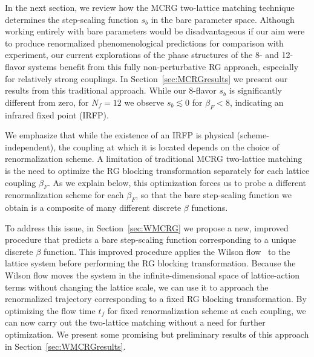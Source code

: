 \documentclass{PoS}
\newcommand{\be}{\ensuremath{\beta} }
\newcommand{\lsim}{\ensuremath{\lesssim} }
\newcommand{\secref}[1]{Section~\ref{#1}}
\begin{document}
In the next section, we review how the MCRG two-lattice matching technique determines the step-scaling function $s_b$ in the bare parameter space.
Although working entirely with bare parameters would be disadvantageous if our aim were to produce renormalized phenomenological predictions for comparison with experiment, our current explorations of the phase structures of the 8- and 12-flavor systems benefit from this fully non-perturbative RG approach, especially for relatively strong couplings.
In \secref{sec:MCRGresults} we present our results from this traditional approach.
While our 8-flavor $s_b$ is significantly different from zero, for $N_f = 12$ we observe $s_b \lsim 0$ for $\be_F < 8$, indicating an infrared fixed point (IRFP).

We emphasize that while the existence of an IRFP is physical (scheme-independent), the coupling at which it is located depends on the choice of renormalization scheme.
A limitation of traditional MCRG two-lattice matching is the need to optimize the RG blocking transformation separately for each lattice coupling $\be_F$.
As we explain below, this optimization forces us to probe a different renormalization scheme for each $\be_F$, so that the bare step-scaling function we obtain is a composite of many different discrete \be functions.

To address this issue, in \secref{sec:WMCRG} we propose a new, improved procedure that predicts a bare step-scaling function corresponding to a unique discrete \be function.
This improved procedure applies the Wilson flow~\cite{Narayanan:2006rf, Luscher:2010iy} to the lattice system before performing the RG blocking transformation.
Because the Wilson flow moves the system in the infinite-dimensional space of lattice-action terms without changing the lattice scale, we can use it to approach the renormalized trajectory corresponding to a fixed RG blocking transformation.
By optimizing the flow time $t_f$ for fixed renormalization scheme at each coupling, we can now carry out the two-lattice matching without a need for further optimization.
We present some promising but preliminary results of this approach in \secref{sec:WMCRGresults}.



\end{document}
